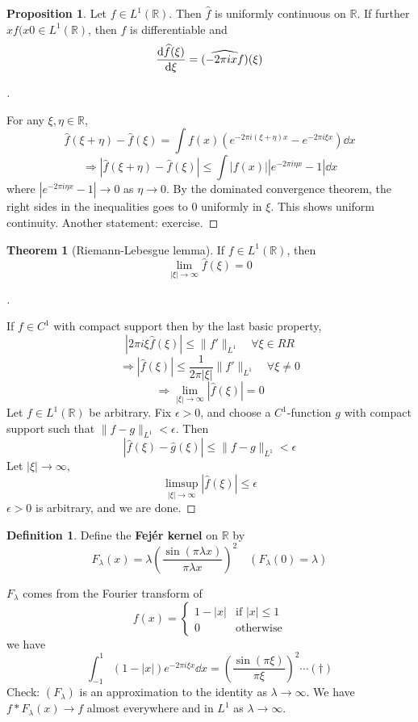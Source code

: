 \documentclass{article}
\theoremstyle{definition}
\newtheorem{thm}{Theorem}
\newtheorem{dfn}{Definition}
\newtheorem{prop}{Proposition}
\newenvironment{proofs}[1][\proofname]{%
  \begin{proof}[#1]$ $\par\nobreak\ignorespaces
}{%
  \end{proof}
}
\newcommand{\RR}{\mathbb R}
\newcommand{\Ra}{\Rightarrow}
\begin{document}
\begin{prop}
	Let $f \in L^1(\RR)$.
	Then $\widehat{f}$ is uniformly continuous on $\RR$.
	If further $x f(x0 \in L^1(\RR)$, then $\widehat{f}$ is differentiable and 
	\[
		\dv{\widehat{f}(\xi)}{\xi} = \widehat{(- 2 \pi i x f)} (\xi)
	\]
\end{prop}

\begin{proofs}
	For any $\xi, \eta \in \RR$, 
	\[
		\widehat{f}(\xi + \eta) - \widehat{f}(\xi) = \int f(x) (e^{- 2 \pi i (\xi + \eta) x} - e^{- 2 \pi i \xi x}) \dd{x}
	\]
	\[
		\Ra |\widehat{f}(\xi + \eta) - \widehat{f}(\xi)| \leq \int |f(x)| |e^{- 2 \pi i \eta x} - 1| \dd{x} 
	\]
	where $|e^{- 2 \pi i \eta x} - 1| \to 0$ as $\eta \to 0$.
	By the dominated convergence theorem, the right sides in the inequalities goes to 0 uniformly in $\xi$.	
	This shows uniform continuity.
	Another statement: exercise.
\end{proofs}

\begin{thm}[Riemann-Lebesgue lemma]
	If $f \in L^1(\RR)$, then
	\[
		\lim_{|\xi| \to \infty} \widehat{f}(\xi) = 0
	\]
\end{thm}

\begin{proofs}
	If $f \in C^1$ with compact support then by the last basic property, 
	\[
		|2 \pi i \xi \widehat{f}(\xi)| \leq \|f'\|_{L^1} \quad \forall \xi \in RR
	\]
	\[
		\Ra |\widehat{f}(\xi)| \leq \frac{1}{2 \pi |\xi|} \|f'\|_{L^1} \quad \forall \xi \neq 0
	\]
	\[
		\Ra \lim_{|\xi| \to \infty} |\widehat{f}(\xi)| = 0
	\]
	Let $f \in L^1(\RR)$ be arbitrary.
	Fix $\epsilon > 0$, and choose a $C^1$-function $g$ with compact support such that $\|f - g\|_{L^1} < \epsilon$.
	Then 
	\[
		|\widehat{f}(\xi) - \widehat{g}(\xi)| \leq \|f - g\|_{L^1} < \epsilon
	\]
	Let $|\xi| \to \infty$, 
	\[
		\limsup_{|\xi| \to \infty} |\widehat{f}(\xi)| \leq \epsilon
	\]
	$\epsilon > 0$ is arbitrary, and we are done.
\end{proofs}

\begin{dfn}
	Define the \textbf{Fej\'er kernel} on $\RR$ by 
	\[
		F_\lambda(x) = \lambda \left( \frac{\sin (\pi \lambda x)}{\pi \lambda x} \right)^2 \quad (F_\lambda(0) = \lambda)
	\]
\end{dfn}

$F_\lambda$ comes from the Fourier transform of 
\[
	f(x) = 
	\begin{cases}
		1 - |x| & \text{if } |x| \leq 1\\
		0 & \text{otherwise}
	\end{cases}
\]
we have
\[
	\int_{-1}^1 (1 - |x|) e^{- 2 \pi i \xi x} \dd{x} = \left( \frac{\sin (\pi \xi)}{\pi \xi} \right)^2 \cdots (\dagger)
\]
Check: $(F_\lambda)$ is an approximation to the identity as $\lambda \to \infty$.
We have $f * F_\lambda(x) \to f$ almost everywhere and in $L^1$ as $\lambda \to \infty$.
\end{document}
